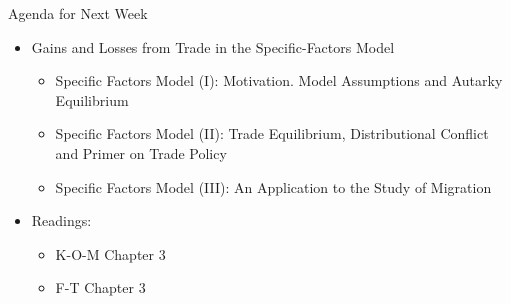 \documentclass[10pt,hyperref={CJKbookmarks=true},xcolor=dvipsnames,aspectratio=169]{beamer}
\begin{document}
\begin{frame}{Agenda for Next Week}

\begin{itemize}
\item Gains and Losses from Trade in the Specific-Factors Model

\begin{itemize}
\item Specific Factors Model (I): Motivation. Model Assumptions and Autarky
Equilibrium 
\item Specific Factors Model (II): Trade Equilibrium, Distributional Conflict
and Primer on Trade Policy 
\item Specific Factors Model (III): An Application to the Study of Migration 
\end{itemize}
\item Readings: 

\begin{itemize}
\item K-O-M Chapter 3 
\item F-T Chapter 3

\end{itemize}
\end{itemize}
\end{frame}
\end{document}
